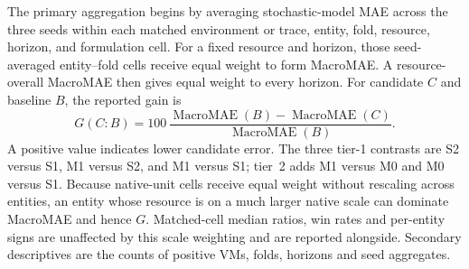 \documentclass[a4paper,11pt]{article}
\begin{document}
The primary aggregation begins by averaging stochastic-model MAE across the
three seeds within each matched environment or trace, entity, fold, resource,
horizon, and formulation cell.  For a fixed resource and horizon, those
seed-averaged entity--fold cells receive equal weight to form MacroMAE. A
resource-overall MacroMAE then gives equal weight to every horizon.  For
candidate $C$ and baseline $B$, the reported gain is
\begin{equation}
  G(C\!:\!B)=100\,
  \frac{\operatorname{MacroMAE}(B)-\operatorname{MacroMAE}(C)}
       {\operatorname{MacroMAE}(B)}.
  \label{eq:macro-gain}
\end{equation}
A positive value indicates lower candidate error.  The three tier-1
contrasts are S2 versus S1, M1 versus S2, and M1 versus S1; tier~2 adds M1
versus M0 and M0 versus S1. Because native-unit cells receive equal weight
without rescaling across entities, an entity whose resource is on a much
larger native scale can dominate MacroMAE and hence $G$. Matched-cell median
ratios, win rates and per-entity signs are unaffected by this scale
weighting and are reported alongside.  Secondary descriptives are the counts
of positive VMs, folds, horizons and seed aggregates.
\end{document}
